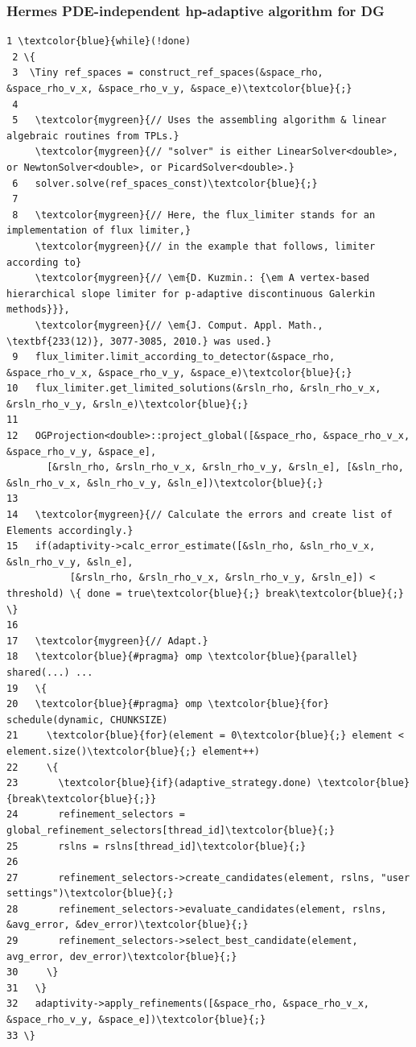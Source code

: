 \documentclass{beamer}
\begin{document}
\begin{frame}[fragile]
\frametitle{Hermes PDE-independent hp-adaptive algorithm for DG}
\begin{Verbatim}[commandchars=\\\{\}, fontsize=\Tinyc]
 1 \textcolor{blue}{while}(!done)
 2 \{
 3  \Tiny ref_spaces = construct_ref_spaces(&space_rho, &space_rho_v_x, &space_rho_v_y, &space_e)\textcolor{blue}{;}
 4
 5   \textcolor{mygreen}{// Uses the assembling algorithm & linear algebraic routines from TPLs.}
     \textcolor{mygreen}{// "solver" is either LinearSolver<double>, or NewtonSolver<double>, or PicardSolver<double>.}
 6   solver.solve(ref_spaces_const)\textcolor{blue}{;}
 7   
 8   \textcolor{mygreen}{// Here, the flux_limiter stands for an implementation of flux limiter,}
     \textcolor{mygreen}{// in the example that follows, limiter according to}
     \textcolor{mygreen}{// \em{D. Kuzmin.: {\em A vertex-based hierarchical slope limiter for p-adaptive discontinuous Galerkin methods}}}, 
     \textcolor{mygreen}{// \em{J. Comput. Appl. Math., \textbf{233(12)}, 3077-3085, 2010.} was used.}
 9   flux_limiter.limit_according_to_detector(&space_rho, &space_rho_v_x, &space_rho_v_y, &space_e)\textcolor{blue}{;}
10   flux_limiter.get_limited_solutions(&rsln_rho, &rsln_rho_v_x, &rsln_rho_v_y, &rsln_e)\textcolor{blue}{;}
11
12   OGProjection<double>::project_global([&space_rho, &space_rho_v_x, &space_rho_v_y, &space_e],
       [&rsln_rho, &rsln_rho_v_x, &rsln_rho_v_y, &rsln_e], [&sln_rho, &sln_rho_v_x, &sln_rho_v_y, &sln_e])\textcolor{blue}{;}
13
14   \textcolor{mygreen}{// Calculate the errors and create list of Elements accordingly.}
15   if(adaptivity->calc_error_estimate([&sln_rho, &sln_rho_v_x, &sln_rho_v_y, &sln_e],
           [&rsln_rho, &rsln_rho_v_x, &rsln_rho_v_y, &rsln_e]) < threshold) \{ done = true\textcolor{blue}{;} break\textcolor{blue}{;} \}
16 
17   \textcolor{mygreen}{// Adapt.}
18   \textcolor{blue}{#pragma} omp \textcolor{blue}{parallel} shared(...) ...
19   \{
20   \textcolor{blue}{#pragma} omp \textcolor{blue}{for} schedule(dynamic, CHUNKSIZE)
21     \textcolor{blue}{for}(element = 0\textcolor{blue}{;} element < element.size()\textcolor{blue}{;} element++)
22     \{
23       \textcolor{blue}{if}(adaptive_strategy.done) \textcolor{blue}{break\textcolor{blue}{;}}
24       refinement_selectors = global_refinement_selectors[thread_id]\textcolor{blue}{;}
25       rslns = rslns[thread_id]\textcolor{blue}{;}
26       
27       refinement_selectors->create_candidates(element, rslns, "user settings")\textcolor{blue}{;}
28       refinement_selectors->evaluate_candidates(element, rslns, &avg_error, &dev_error)\textcolor{blue}{;}
29       refinement_selectors->select_best_candidate(element, avg_error, dev_error)\textcolor{blue}{;}
30     \}
31   \}
32   adaptivity->apply_refinements([&space_rho, &space_rho_v_x, &space_rho_v_y, &space_e])\textcolor{blue}{;}
33 \}
\end{Verbatim}
\end{frame}
\end{document}

